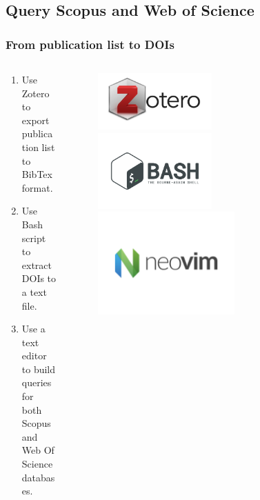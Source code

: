 \documentclass[aspectratio=169]{beamer}
\begin{document}
\subsection{Query Scopus and Web of Science}


\begin{frame}
    \frametitle{From publication list to DOIs}
    \begin{columns}
        \begin{column}{0.5\textwidth}
            \begin{enumerate}
                \item Use Zotero to export publication list to BibTex format.
                \item Use Bash script to extract DOIs to a text file.
                \item Use a text editor to build queries for both Scopus and 
                    Web Of Science databases.
            \end{enumerate}
        \end{column}
        \begin{column}{0.5\textwidth}
			\begin{figure}
				\centering
				\includegraphics[width=0.5\textwidth]{logos/zotero.jpg}
                \includegraphics[width=0.5\textwidth]{logos/bash.png}
                \includegraphics[width=0.6\textwidth]{logos/neovim-logo.png}
			\end{figure}
        \end{column}
    \end{columns}
\end{frame}
\end{document}
